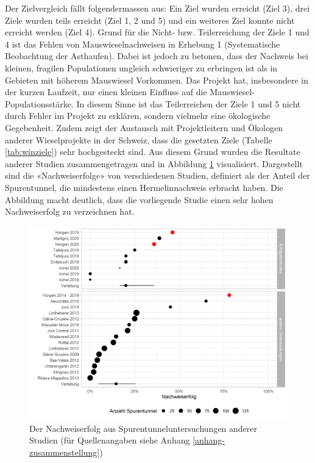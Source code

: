 \documentclass[
  oneside]{scrbook}
\begin{document}
Der Zielvergleich fällt folgendermassen aus: Ein Ziel wurden erreicht (Ziel 3), drei Ziele wurden teils erreicht (Ziel 1, 2 und 5) und ein weiteres Ziel konnte nicht erreicht werden (Ziel 4). Grund für die Nicht- bzw. Teilerreichung der Ziele 1 und 4 ist das Fehlen von Mauswieselnachweisen in Erhebung 1 (Systematische Beobachtung der Asthaufen). Dabei ist jedoch zu betonen, dass der Nachweis bei kleinen, fragilen Populationen ungleich schwieriger zu erbringen ist als in Gebieten mit höherem Mauswiesel Vorkommen. Das Projekt hat, insbesondere in der kurzen Laufzeit, nur einen kleinen Einfluss auf die Mauswiesel-Populationsstärke. In diesem Sinne ist das Teilerreichen der Ziele 1 und 5 nicht durch Fehler im Projekt zu erklären, sondern vielmehr eine ökologische Gegebenheit. Zudem zeigt der Austausch mit Projektleitern und Ökologen anderer Wieselprojekte in der Schweiz, dass die gesetzten Ziele (Tabelle \ref{tab:winziele}) sehr hochgesteckt sind. Aus diesem Grund wurden die Resultate anderer Studien zusammengetragen und in Abbildung \ref{fig:kontext} visualisiert. Dargestellt sind die «Nachweiserfolge» von verschiedenen Studien, definiert als der Anteil der Spurentunnel, die mindestens einen Hermelinnachweis erbracht haben. Die Abbildung macht deutlich, dass die vorliegende Studie einen sehr hohen Nachweiserfolg zu verzeichnen hat.



\begin{figure}
\includegraphics[width=1\linewidth]{images/kontext} \caption{Der Nachweiserfolg aus Spurentunneluntersuchungen anderer Studien (für Quellenangaben siehe Anhang \ref{anhang-zusammenstellung})}\label{fig:kontext}
\end{figure}
\end{document}
